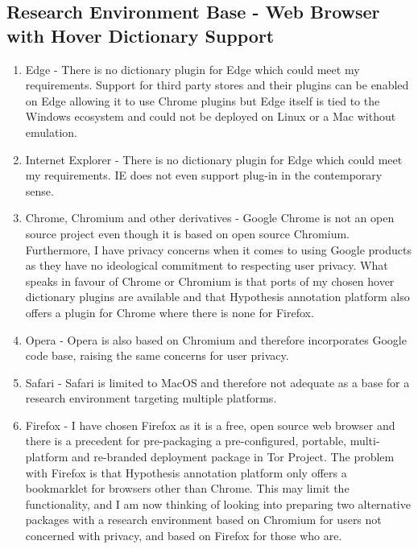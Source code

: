 \documentclass{article}
\begin{document}
\subsection{Research Environment Base - Web Browser with Hover Dictionary Support}
\begin{enumerate}
    \item Edge - There is no dictionary plugin for Edge which could meet my requirements. Support for third party stores and their plugins can be enabled on Edge allowing it to use Chrome plugins but Edge itself is tied to the Windows ecosystem and could not be deployed on Linux or a Mac without emulation.
    \item Internet Explorer - There is no dictionary plugin for Edge which could meet my requirements. IE does not even support plug-in in the contemporary sense.
    \item Chrome, Chromium and other derivatives - Google Chrome is not an open source project even though it is based on open source Chromium. Furthermore, I have privacy concerns when it comes to using Google products as they have no ideological commitment to respecting user privacy. What speaks in favour of Chrome or Chromium is that ports of my chosen hover dictionary plugins are available and that Hypothesis annotation platform also offers a plugin for Chrome where there is none for Firefox.
    \item Opera - Opera is also based on Chromium and therefore incorporates Google code base, raising the same concerns for user privacy.
    \item Safari - Safari is limited to MacOS and therefore not adequate as a base for a research environment targeting multiple platforms.
    \item Firefox - I have chosen Firefox as it is a free, open source web browser and there is a precedent for pre-packaging a pre-configured, portable, multi-platform and re-branded deployment package in Tor Project. The problem with Firefox is that Hypothesis annotation platform only offers a bookmarklet for browsers other than Chrome. This may limit the functionality, and I am now thinking of looking into preparing two alternative packages with a research environment based on Chromium for users not concerned with privacy, and based on Firefox for those who are.
\end{enumerate}
\end{document}

